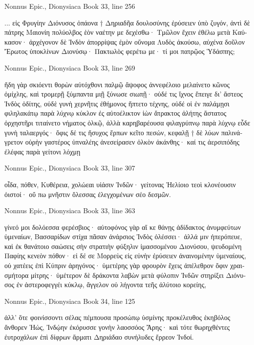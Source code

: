 \documentclass[12pt,letterpaper,twoside,final]{memoir}
\begin{document}
\begin{greek}
Nonnus Epic., Dionysiaca 
Book 33, line 256

                                                       ... 
εἰς Φρυγίην Διόνυσος ὀπάονα † Δηριαδῆα 
δουλοσύνης ἐρύσειεν ὑπὸ ζυγόν, ἀντὶ δὲ πάτρης 
Μαιονίη πολύολβος ἑὸν ναέτην με δεχέσθω· 
Τμῶλον ἔχειν ἐθέλω μετὰ Καύκασον· ἀρχέγονον δὲ 
Ἰνδὸν ἀπορρίψας ἐμὸν οὔνομα Λυδὸς ἀκούσω, 
αὐχένα δοῦλον Ἔρωτος ὑποκλίνων Διονύσῳ· 
Πακτωλὸς φερέτω με· τί μοι πατρῷος Ὑδάσπης; 



Nonnus Epic., Dionysiaca 
Book 33, line 269

ἤδη γὰρ σκιόεντι θορὼν αὐτόχθονι παλμῷ 
ἄψοφος ἀννεφέλοιο μελαίνετο κῶνος ὀμίχλης,   
καὶ τρομερῇ ξύμπαντα μιῇ ξύνωσε σιωπῇ· 
οὐδέ τις ἴχνος ἔπειγε δι' ἄστεος Ἰνδὸς ὁδίτης, 
οὐδὲ γυνὴ χερνῆτις ἐθήμονος ἥπτετο τέχνης, 
οὐδέ οἱ ἐν παλάμῃσι φιληλακάτῳ παρὰ λύχνῳ 
κύκλον ἐς αὐτοέλικτον ἰὼν ἄτρακτος ἀλήτης 
ἄστατος ὀρχηστῆρι τιταίνετο νήματος ὁλκῷ, 
ἀλλὰ καρηβαρέουσα φιλαγρύπνῳ παρὰ λύχνῳ 
εὗδε γυνὴ ταλαεργός· ὄφις δέ τις ἥσυχος ἕρπων 
κεῖτο πεσών, κεφαλῇ † δὲ λύων παλινάγρετον οὐρὴν 
γαστέρος ὑπναλέης ἀνεσείρασεν ὁλκὸν ἀκάνθης· 
καί τις ἀερσιπόδης ἐλέφας παρὰ γείτονι λόχμῃ 




Nonnus Epic., Dionysiaca 
Book 33, line 307

οἶδα, πόθεν, Κυθέρεια, χολώεαι υἱάσιν Ἰνδῶν· 
γείτονας Ἠελίοιο τεοὶ κλονέουσιν ὀιστοί· 
οὔ πω μνῆστιν ὄλεσσας ἐλεγχομένων σέο δεσμῶν. 



Nonnus Epic., Dionysiaca 
Book 33, line 363

γίνεό μοι δολόεσσα φερέσβιος· αὐτοφόνος γὰρ   
αἴ κε θάνῃς ἀδίδακτος ἀνυμφεύτων ὑμεναίων, 
Βασσαρίδων στίχα πᾶσαν ἀνάρσιος Ἰνδὸς ὀλέσσει· 
ἀλλά μιν ἠπερόπευε, καὶ ἐκ θανάτοιο σαώσεις 
σὴν στρατιὴν φύξηλιν ἱμασσομένου Διονύσου, 
ψευδομένη Παφίης κενεὸν πόθον· εἰ δέ σε Μορρεὺς 
εἰς εὐνὴν ἐρύσειεν ἀναινομένην ὑμεναίους, 
οὐ χατέεις ἐπὶ Κύπριν ἀρηγόνος· ὑμετέρης γὰρ 
φρουρὸν ἔχεις ἀπέλεθρον ὄφιν χραισμήτορα μίτρης· 
ὑμέτερον δὲ δράκοντα λαβὼν μετὰ φύλοπιν Ἰνδῶν 
στηρίξει Διόνυσος ἐν ἀστεροφεγγέι κύκλῳ, 
ἄγγελον οὐ λήγοντα τεῆς ἀλύτοιο κορείης, 




Nonnus Epic., Dionysiaca 
Book 34, line 125

ἀλλ' ὅτε φοινίσσοντι σέλας πέμπουσα προσώπῳ 
ὑσμίνης προκέλευθος ἑκηβόλος ἄνθορεν Ἠώς, 
Ἰνδῴην ἐκόρυσσε γονὴν λαοσσόος Ἄρης· 
καὶ τότε θωρηχθέντες ἐυτροχάλων ἐπὶ δίφρων 
ἅρματι Δηριάδαο συνήλυδες ἔρρεον Ἰνδοί. 




\end{greek}
\end{document}

